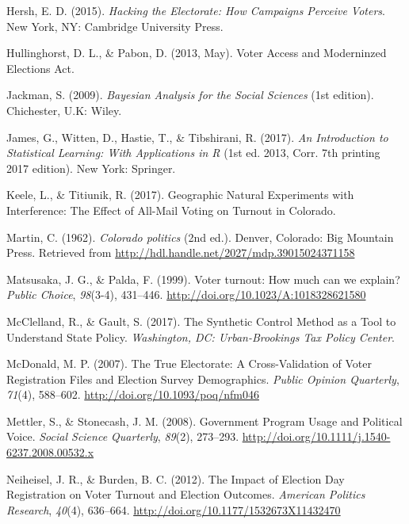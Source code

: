 \documentclass[12pt,twoside]{reedthesis}
\begin{document}
  \hypertarget{ref-hersh_hacking_2015}{}
  Hersh, E. D. (2015). \emph{Hacking the Electorate: How Campaigns
  Perceive Voters}. New York, NY: Cambridge University Press.
  
  \hypertarget{ref-hullinghorst_voter_2013}{}
  Hullinghorst, D. L., \& Pabon, D. (2013, May). Voter Access and
  Moderninzed Elections Act.
  
  \hypertarget{ref-jackman_bayesian_2009}{}
  Jackman, S. (2009). \emph{Bayesian Analysis for the Social Sciences}
  (1st edition). Chichester, U.K: Wiley.
  
  \hypertarget{ref-james_introduction_2017}{}
  James, G., Witten, D., Hastie, T., \& Tibshirani, R. (2017). \emph{An
  Introduction to Statistical Learning: With Applications in R} (1st ed.
  2013, Corr. 7th printing 2017 edition). New York: Springer.
  
  \hypertarget{ref-keele_geographic_2017}{}
  Keele, L., \& Titiunik, R. (2017). Geographic Natural Experiments with
  Interference: The Effect of All-Mail Voting on Turnout in Colorado.
  
  \hypertarget{ref-martin_colorado_1962}{}
  Martin, C. (1962). \emph{Colorado politics} (2nd ed.). Denver, Colorado:
  Big Mountain Press. Retrieved from
  \url{http://hdl.handle.net/2027/mdp.39015024371158}
  
  \hypertarget{ref-matsusaka_voter_1999}{}
  Matsusaka, J. G., \& Palda, F. (1999). Voter turnout: How much can we
  explain? \emph{Public Choice}, \emph{98}(3-4), 431--446.
  \url{http://doi.org/10.1023/A:1018328621580}
  
  \hypertarget{ref-mcclelland_synthetic_2017}{}
  McClelland, R., \& Gault, S. (2017). The Synthetic Control Method as a
  Tool to Understand State Policy. \emph{Washington, DC: Urban-Brookings
  Tax Policy Center}.
  
  \hypertarget{ref-mcdonald_true_2007}{}
  McDonald, M. P. (2007). The True Electorate: A Cross-Validation of Voter
  Registration Files and Election Survey Demographics. \emph{Public
  Opinion Quarterly}, \emph{71}(4), 588--602.
  \url{http://doi.org/10.1093/poq/nfm046}
  
  \hypertarget{ref-mettler_government_2008}{}
  Mettler, S., \& Stonecash, J. M. (2008). Government Program Usage and
  Political Voice. \emph{Social Science Quarterly}, \emph{89}(2),
  273--293. \url{http://doi.org/10.1111/j.1540-6237.2008.00532.x}
  
  \hypertarget{ref-neiheisel_impact_2012}{}
  Neiheisel, J. R., \& Burden, B. C. (2012). The Impact of Election Day
  Registration on Voter Turnout and Election Outcomes. \emph{American
  Politics Research}, \emph{40}(4), 636--664.
  \url{http://doi.org/10.1177/1532673X11432470}
  
\end{document}
